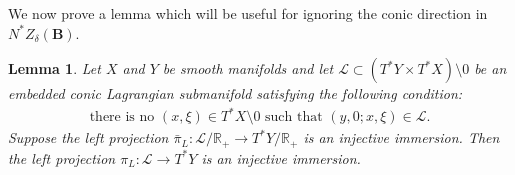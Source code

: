 \documentclass[11pt]{amsart}
\newtheorem{Lemma}[Theorem]{Lemma}
\theoremstyle{definition}
\numberwithin{equation}{section}
\newcommand{\BB}{\mathbf B}
\begin{document}
We now prove a lemma which will be useful for ignoring the conic direction in $N^* Z_{\delta}(\BB)$.

\begin{Lemma}
\label{lem: conic no matter}
Let $X$ and $Y$ be smooth manifolds and let $\mathcal L \subset (T^*Y \times T^*X) \setminus 0$ be an embedded conic Lagrangian submanifold satisfying the following condition:
\begin{eqnarray}
    \label{eq: no flat spots}
    \text{there is no } (x,\xi)\in T^*X\setminus 0 \text{ such that } (y,0;x,\xi) \in\mathcal L.
\end{eqnarray}
Suppose the left projection $\bar \pi_L : \mathcal L/\mathbb R_+ \to T^*Y/\mathbb R_+$ is an injective immersion. Then the left projection $\pi_L : \mathcal L \to T^*Y$ is an injective immersion.
\end{Lemma}
\end{document}

